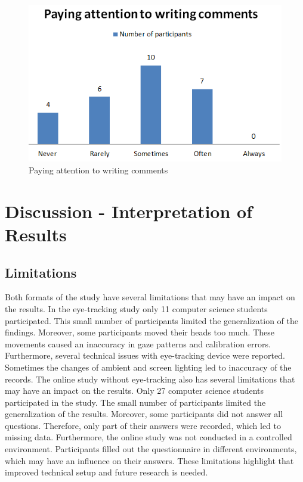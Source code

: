 \begin{figure} [H]
  \centering
  \includegraphics[scale=1.1]{figures/comAt.png}
  \caption{Paying attention to writing comments }
  \label{fig:AnhangsChor}
\end{figure}


\chapter{Discussion - Interpretation of Results}

\section{Limitations} 
Both formats of the study have several limitations that may have an impact on the results.
In the eye-tracking study only 11 computer science students participated.  This small number of participants limited the generalization of the findings.  Moreover, some participants moved their heads too much.  These movements caused an inaccuracy in gaze patterns and calibration errors. Furthermore, several technical issues with eye-tracking device were reported. Sometimes the changes of ambient and screen lighting led to inaccuracy of the records.
The online study without eye-tracking also has several limitations that may have an impact on the results. 
Only 27 computer science students participated in the study. The small number of participants limited the generalization of the results. 
Moreover, some participants did not answer all questions. Therefore, only part of their answers were recorded, which led to missing data. 
Furthermore, the online study was not conducted in a controlled environment. Participants filled out the questionnaire in different environments, which may have an influence on their answers.  
These limitations highlight that improved technical setup and future research is needed. 


